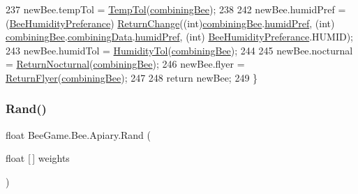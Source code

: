 \begin{DoxyCode}
237             newBee.tempTol = \hyperlink{class_bee_game_1_1_bee_1_1_apiary_a09fe0446372a57b69863b432e0fdee5e}{TempTol}(\hyperlink{class_bee_game_1_1_bee_1_1_apiary_a3b3bbe1a8ba0be1c3310a2660b1cdf42}{combiningBee});
238 
242             newBee.humidPref = (\hyperlink{namespace_bee_game_1_1_enums_a66566cbc9da8d1d1e402156b4bd3bf9d}{BeeHumidityPreferance})
      \hyperlink{class_bee_game_1_1_bee_1_1_apiary_a2bdcdda97b0d7f0e4717aa2da979ee65}{ReturnChange}((\textcolor{keywordtype}{int})\hyperlink{class_bee_game_1_1_bee_1_1_apiary_a3b3bbe1a8ba0be1c3310a2660b1cdf42}{combiningBee}.\hyperlink{struct_bee_game_1_1_bee_1_1_bee_data_a6b786e9cb8f5bbf7b6d1a16d7c7eb37e}{humidPref}, (int)
      \hyperlink{class_bee_game_1_1_bee_1_1_apiary_a3b3bbe1a8ba0be1c3310a2660b1cdf42}{combiningBee}.\hyperlink{struct_bee_game_1_1_bee_1_1_bee_data_ab12331d23b41365d0a1be0d7eba7fa0f}{combiningData}.\hyperlink{struct_bee_game_1_1_bee_1_1_combining_bee_data_ab9a9a9623d942632f8007711b65f909e}{humidPref}, (\textcolor{keywordtype}{int})
      \hyperlink{namespace_bee_game_1_1_enums_a66566cbc9da8d1d1e402156b4bd3bf9d}{BeeHumidityPreferance}.HUMID);
243             newBee.humidTol = \hyperlink{class_bee_game_1_1_bee_1_1_apiary_a066f8a76bdd01acbaed48e25768f36e4}{HumidityTol}(\hyperlink{class_bee_game_1_1_bee_1_1_apiary_a3b3bbe1a8ba0be1c3310a2660b1cdf42}{combiningBee});
244 
245             newBee.nocturnal = \hyperlink{class_bee_game_1_1_bee_1_1_apiary_a88c438661490f5f8c0213353be1d5cac}{ReturnNocturnal}(\hyperlink{class_bee_game_1_1_bee_1_1_apiary_a3b3bbe1a8ba0be1c3310a2660b1cdf42}{combiningBee});
246             newBee.flyer = \hyperlink{class_bee_game_1_1_bee_1_1_apiary_a3c794be5d19c1445f3a48ebc82d49980}{ReturnFlyer}(\hyperlink{class_bee_game_1_1_bee_1_1_apiary_a3b3bbe1a8ba0be1c3310a2660b1cdf42}{combiningBee});
247 
248             \textcolor{keywordflow}{return} newBee;
249         \}
\end{DoxyCode}
\mbox{\label{class_bee_game_1_1_bee_1_1_apiary_a1523391d65f498bd64df18f62840c2f0}} 
\subsubsection{\texorpdfstring{Rand()}{Rand()}}
{\footnotesize\ttfamily float Bee\+Game.\+Bee.\+Apiary.\+Rand (\begin{DoxyParamCaption}\item[{float \mbox{[}$\,$\mbox{]}}]{weights }\end{DoxyParamCaption})\hspace{0.3cm}{\ttfamily [private]}}



